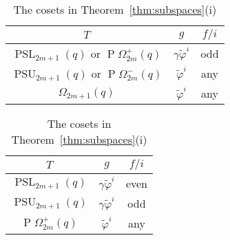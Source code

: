 \documentclass[11pt]{article}
\numberwithin{equation}{section}
\theoremstyle{shdefinition}
\theoremstyle{shplain}
\newcommand{\g}{\gamma}
\renewcommand{\wp}{\widetilde{\varphi}}
\newcommand{\<}{\langle}
\renewcommand{\>}{\rangle}
\renewcommand{\:}{\colon}
\newcommand{\PSL}{\operatorname{PSL}}
\newcommand{\PSU}{\operatorname{PSU}}
\newcommand{\Om}{\Omega}
\newcommand{\POm}{\operatorname{P}\!\Om}
\begin{document}
\begin{table} 
\centering
\begin{minipage}{0.5\textwidth}
\centering
\caption{The cosets in Theorem~\ref{thm:subspaces}} \label{tab:1spaces}
\begin{tabular}{ccc} 
\hline
$T$                                  & $g$        & $f/i$ \\
\hline
$\PSL_{2m+1}(q)$ or $\POm^+_{2m}(q)$ & $\g\wp^i$  & odd   \\
$\PSU_{2m+1}(q)$ or $\POm^-_{2m}(q)$ & $\wp^i$    & any   \\
$\Om_{2m+1}(q)$                      & $\wp^i$    & any   \\
\hline
\end{tabular}
\end{minipage}
\begin{minipage}{0.4\textwidth}
\centering
\caption{The cosets in Theorem~\ref{thm:subspaces}(i)} \label{tab:subspaces}
\begin{tabular}{ccc} 
\hline
$T$              & $g$        & $f/i$ \\
\hline
$\PSL_{2m+1}(q)$ & $\g\wp^i$  & even  \\
$\PSU_{2m+1}(q)$ & $\g\wp^i$  & odd   \\
$\POm^+_{2m}(q)$ & $\wp^i$    & any   \\
\hline
\end{tabular}
\end{minipage}
\end{table}
\end{document}
